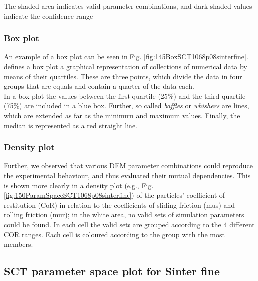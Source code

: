 The shaded area indicates valid parameter combinations, and dark shaded
values indicate the confidence range




\subsubsection{Box plot}
\label{subsubsec:boxplot}
  
An example of a box plot can be seen
in Fig. \ref{fig:145BoxSCT1068p08sinterfine}.
\citet{RefWorks:207} defines a box plot a graphical representation of
collections of numerical data by means of their quartiles.
These are three points, which divide the data in four groups that are equals and
contain a quarter of the data each.\\
In a box plot the values between the first quartile (25\%) and the third
quartile (75\%) are included in a blue box.
Further, so called \textit{baffles} or \textit{whishers} are lines, which are
extended as far as the minimum and maximum values.
Finally, the median is represented as a red straight line.



\subsubsection{Density plot}
\label{subsubsec:densityplot}

Further, we observed that various \acs{DEM} parameter
combinations could reproduce the experimental behaviour, and thus evaluated
their mutual dependencies.
This is shown more clearly in a density plot (e.g., Fig. 
\ref{fig:150ParamSpaceSCT1068p08sinterfine}) 
of the particles' coefficient of restitution (\acs{CoR}) in relation to
the coefficients of sliding friction (\acs{mus}) and rolling friction (\acs{mur}); 
in the white area, no valid sets of simulation parameters could be found.
In each cell the valid sets are grouped according to the 4 different COR
ranges.
Each cell is coloured according to the group with the most members.




\subsection{SCT parameter space plot for Sinter fine}
\label{subsec:sctparameterspacesinterfine}

